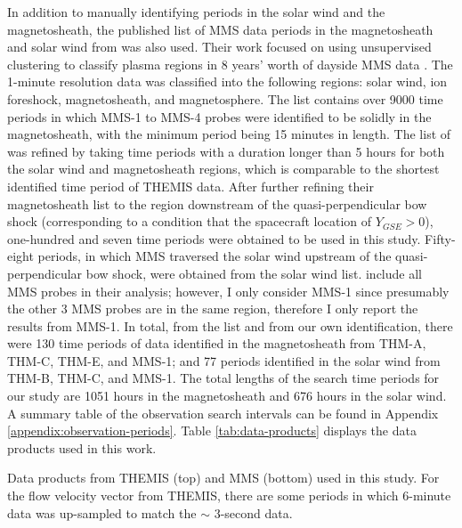 In addition to manually identifying periods in the solar wind and the magnetosheath, the published list of MMS data periods in the magnetosheath and solar wind from \cite{ToyEdens:2024} was also used. Their work focused on using unsupervised clustering to classify plasma regions in 8 years' worth of dayside MMS data \citep{ToyEdens2:2024}. The 1-minute resolution data was classified into the following regions: solar wind, ion foreshock, magnetosheath, and magnetosphere. The \cite{ToyEdens:2024} list contains over 9000 time periods in which MMS-1 to MMS-4 probes were identified to be solidly in the magnetosheath, with the minimum period being 15 minutes in length. The list of \cite{ToyEdens:2024} was refined by taking time periods with a duration longer than 5 hours for both the solar wind and magnetosheath regions, which is comparable to the shortest identified time period of THEMIS data. After further refining their magnetosheath list to the region downstream of the quasi-perpendicular bow shock (corresponding to a condition that the spacecraft location of $Y_{GSE}>0$), one-hundred and seven time periods were obtained to be used in this study. Fifty-eight periods, in which MMS traversed the solar wind upstream of the quasi-perpendicular bow shock, were obtained from the \cite{ToyEdens:2024} solar wind list. \cite{ToyEdens2:2024} include all MMS probes in their analysis; however, I only consider MMS-1 since presumably the other 3 MMS probes are in the same region, therefore I only report the results from MMS-1. In total, from the \cite{ToyEdens:2024} list and from our own identification, there were 130 time periods of data identified in the magnetosheath from THM-A, THM-C, THM-E, and MMS-1; and 77 periods identified in the solar wind from THM-B, THM-C, and MMS-1. The total lengths of the search time periods for our study are 1051 hours in the magnetosheath and 676 hours in the solar wind. A summary table of the observation search intervals can be found in Appendix \ref{appendix:observation-periods}. Table \ref{tab:data-products} displays the data products used in this work.

\begin{table}
    \centering
    
    \caption[Data products from THEMIS and MMS]{Data products from THEMIS (top) and MMS (bottom) used in this study. For the flow velocity vector from THEMIS, there are some periods in which 6-minute data was up-sampled to match the $\sim$ 3-second data.}
    \label{tab:data-products}
\end{table}

